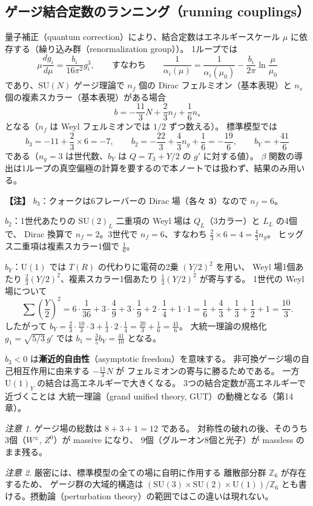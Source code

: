 \documentclass[uplatex,dvipdfmx,a4paper,11pt,openany]{jsbook}
\newcommand{\term}[2]{\textbf{#1}（#2）}
\newcommand{\en}[1]{（#1）}
\newenvironment{note}{\vspace{1ex}\par\footnotesize\noindent\textbf{【注】}}{\par\vspace{1ex}}
\numberwithin{equation}{chapter}
\theoremstyle{definition}
\theoremstyle{plain}
\theoremstyle{remark}
\newtheorem{remark}{注意}[chapter]
\newcommand{\SU}{\mathrm{SU}}
\newcommand{\U}{\mathrm{U}}
\begin{document}
\subsection{ゲージ結合定数のランニング（running couplings）}
量子補正\en{quantum correction}により、結合定数はエネルギースケール $\mu$ に依存する（繰り込み群\en{renormalization group}）。
1ループでは
\begin{equation}
\mu\frac{dg_i}{d\mu}=\frac{b_i}{16\pi^2}g_i^3,
\qquad\text{すなわち}\qquad
\frac{1}{\alpha_i(\mu)}=\frac{1}{\alpha_i(\mu_0)}-\frac{b_i}{2\pi}\ln\frac{\mu}{\mu_0}
\end{equation}
であり、$\SU(N)$ ゲージ理論で $n_f$ 個の Dirac フェルミオン（基本表現）と
$n_s$ 個の複素スカラー（基本表現）がある場合
\begin{equation}
b=-\frac{11}{3}N+\frac23n_f+\frac16n_s
\end{equation}
となる（$n_f$ は Weyl フェルミオンでは $1/2$ ずつ数える）。
標準模型では
\begin{equation}
b_3=-11+\frac23\times6=-7,\qquad
b_2=-\frac{22}{3}+\frac43n_g+\frac16=-\frac{19}{6},\qquad
b_Y=+\frac{41}{6}
\end{equation}
である（$n_g=3$ は世代数、$b_Y$ は $Q=T_3+Y/2$ の $g'$ に対する値）。
$\beta$ 関数の導出は1ループの真空偏極の計算を要するので本ノートでは扱わず、結果のみ用いる。
\begin{note}
\textbf{$b_3$}：クォークは6フレーバーの Dirac 場（各々 $\mathbf 3$）なので $n_f=6$。

\textbf{$b_2$}：1世代あたりの $\SU(2)_L$ 二重項の Weyl 場は $Q_L$（3カラー）と $L_L$ の4個で、
Dirac 換算で $n_f=2$。3世代で $n_f=6$、すなわち $\frac23\times6=4=\frac43n_g$。
ヒッグス二重項は複素スカラー1個で $\frac16$。

\textbf{$b_Y$}：$\U(1)$ では $T(R)$ の代わりに電荷の2乗 $(Y/2)^2$ を用い、
Weyl 場1個あたり $\frac23(Y/2)^2$、複素スカラー1個あたり $\frac13(Y/2)^2$ が寄与する。
1世代の Weyl 場について
\[
\sum\left(\frac Y2\right)^2
=6\cdot\frac1{36}+3\cdot\frac49+3\cdot\frac19+2\cdot\frac14+1\cdot1
=\frac16+\frac43+\frac13+\frac12+1=\frac{10}{3}.
\]
したがって $b_Y=\frac23\cdot\frac{10}{3}\cdot3+\frac13\cdot2\cdot\frac14=\frac{20}{3}+\frac16=\frac{41}{6}$。
大統一理論の規格化 $g_1=\sqrt{5/3}\,g'$ では $b_1=\frac35b_Y=\frac{41}{10}$ となる。
\end{note}
$b_3<0$ は\term{漸近的自由性}{asymptotic freedom}を意味する。
非可換ゲージ場の自己相互作用に由来する $-\frac{11}{3}N$ が
フェルミオンの寄与に勝るためである。
一方 $\U(1)_Y$ の結合は高エネルギーで大きくなる。
3つの結合定数が高エネルギーで近づくことは
大統一理論\en{grand unified theory, GUT}の動機となる（第14章）。
\begin{remark}
ゲージ場の総数は $8+3+1=12$ である。
対称性の破れの後、そのうち3個（$W^\pm$, $Z^0$）が massive になり、
9個（グルーオン8個と光子）が massless のまま残る。
\end{remark}
\begin{remark}
厳密には、標準模型の全ての場に自明に作用する
離散部分群 $\mathbb{Z}_6$ が存在するため、
ゲージ群の大域的構造は
$(\SU(3)\times\SU(2)\times\U(1))/\mathbb{Z}_6$
とも書ける。摂動論\en{perturbation theory}の範囲ではこの違いは現れない。
\end{remark}
\end{document}
